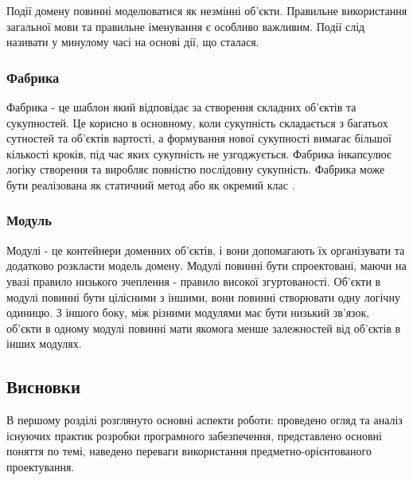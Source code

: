 Події домену повинні моделюватися як незмінні об'єкти.
Правильне використання загальної мови та правильне іменування
є особливо важливим. Події слід називати у минулому часі на основі дії, що сталася.

\subsubsection{Фабрика}
Фабрика - це шаблон який відповідає за створення складних об'єктів та сукупностей.
Це корисно в основному, коли сукупність складається з багатьох 
сутностей та об'єктів вартості, а формування нової сукупності
вимагає більшої кількості кроків, під час яких сукупність не узгоджується.
Фабрика інкапсулює логіку створення та виробляє повністю послідовну сукупність.
Фабрика може бути реалізована як статичний метод або як окремий клас \cite{patterns-gamma}.

\subsubsection{Модуль}
Модулі - це контейнери доменних об'єктів, і вони допомагають їх
організувати та додатково розкласти модель домену.
Модулі повинні бути спроектовані, маючи на увазі правило низького
зчеплення - правило високої згуртованості. Об'єкти в модулі 
повинні бути цілісними з іншими, вони повинні створювати одну логічну одиницю.
З іншого боку, між різними модулями має бути низький зв'язок,
об'єкти в одному модулі повинні мати якомога менше залежностей
від об'єктів в інших модулях.

\subsection{Висновки}
В першому розділі розглянуто основні аспекти роботи: проведено огляд
та аналіз існуючих практик розробки програмного забезпечення,
представлено основні поняття по темі, наведено переваги використання
предметно-орієнтованого проектування.
